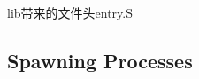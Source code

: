 \documentclass{article}
\begin{document}
\begin{CJK*}{UTF8}{gkai}
lib带来的文件头entry.S
\subsection{Spawning Processes}

\begin{lstlisting}[style=ccode, title={\scriptsize \ttfamily \bfseries kern/: ()}]
\end{lstlisting}


\begin{lstlisting}[style=ccode, title={\scriptsize \ttfamily \bfseries kern/: ()}]
\end{lstlisting}

\begin{lstlisting}[style=acode, title={\scriptsize \ttfamily \bfseries kern/: ()}]
\end{lstlisting}

\begin{lstlisting}[style=console]
\end{lstlisting}

\begin{lstlisting}[style=exercise]
\end{lstlisting}

\clearpage

\end{CJK*}
\end{document}
